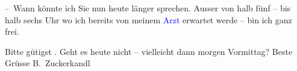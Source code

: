 \pstart
           – Wann könnte ich Sie nun heute länger
                  {\pb}sprechen. Ausser von halb
                  fünf – bis halb sechs Uhr wo ich bereits von meinem \textcolor{blue}{Arzt}\ledrightnote{{$\rightarrow$}\emph{\textcolor{blue}{?? [Arzt von Berta Zuckerkandl]}}} erwartet werde – bin
               ich ganz frei.\pend
           
\pstart
           Bitte gütigst \label{K_L03996-5v}\label{K_L03996-5}. Geht es heute nicht – vielleicht dann
                  morgen{ }Vormittag?\pend
           \pstart Beste Grüsse \spacefill\mbox{B. Zuckerkandl}\pend{}\endnumbering{}  \newcommand{\dateiname}{L03996}\newcommand{\titel}{Berta Zuckerkandl an Arthur Schnitzler, [13. 6. 1911?]}\newcommand{\editorInnen}{Herausgegeben von Jahnke, SelmaMüller, Martin Anton}
